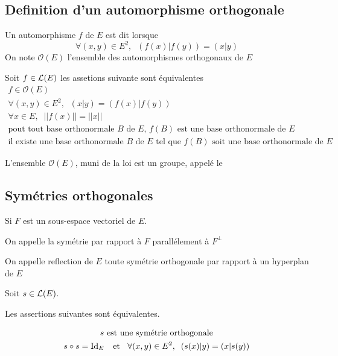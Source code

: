 \subsection{Definition d'un automorphisme orthogonale}

\begin{dfn}
Un automorphisme $f$ de $E$ est dit  lorsque
\[
    \forall (x, y) \in E^2, \;\; (f(x)|f(y)) = (x|y)
\]
On note $\mathcal{O}(E)$ l'ensemble des automorphismes orthogonaux de $E$
\end{dfn}

\begin{prp}
Soit $f \in \operatorname{\mathcal{L}}(E)$ les assetions suivante sont équivalentes
\begin{gather*}
f \in \mathcal{O}(E) \\
\forall (x, y) \in E^2, \;\; (x|y) = (f(x)|f(y)) \\
\forall x \in E, \;\; ||f(x)|| = ||x|| \\
\text{pout tout base orthonormale $B$ de $E$, $f(B)$ est une base
    orthonormale de $E$} \\
\text{il existe une base orthonormale $B$ de $E$ tel que $f(B)$ soit une
    base orthonormale de $E$}
\end{gather*}
\end{prp}

\begin{prp}
L'ensemble $\mathcal{O}(E)$, muni de la loi est un groupe, appelé le
\end{prp}

\subsection{Symétries orthogonales}

\begin{dfn}
Si $F$ est un sous-espace vectoriel de $E$.

On appelle  la symétrie par
rapport à $F$ parallélement à $F^\bot$
\end{dfn}

\begin{dfn}
On appelle reflection de $E$ toute symétrie orthogonale par rapport à
un hyperplan de $E$
\end{dfn}

\begin{prp}
Soit $s \in \operatorname{\mathcal{L}}(E)$.

Les assertions suivantes sont équivalentes.

\begin{gather*}
s \text{ est une symétrie orthogonale} \\
s \circ s = \operatorname{Id}_E \;\;\text{ et }\;\; \forall (x, y) \in E^2, \;\; (s(x)|y) = (x|s(y))
\end{gather*}
\end{prp}


